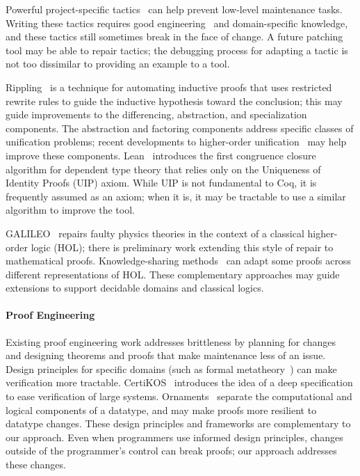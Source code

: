 Powerful project-specific tactics~\cite{chlipala:cpdt, Chlipala2013} can help prevent low-level maintenance tasks.
Writing these tactics requires good engineering~\cite{Gonthier2011} and domain-specific knowledge,
and these tactics still sometimes break in the face of change.
A future patching tool may be able to repair tactics; the debugging process
for adapting a tactic is not too dissimilar to providing an example to a tool.

Rippling~\cite{rippling} is a technique for automating inductive proofs that uses restricted rewrite rules to
guide the inductive hypothesis toward the conclusion; this may guide improvements to the
differencing, abstraction, and specialization components.
The abstraction and factoring components address specific classes of unification problems;
recent developments to higher-order unification~\cite{Miller:2012:PHL:2331097} may help
improve these components.
Lean~\cite{selsam:lean} introduces the first congruence closure algorithm for dependent type theory that
relies only on the Uniqueness of Identity Proofs (UIP) axiom. While UIP is not fundamental to Coq,
it is frequently assumed as an axiom; when it is, it may be tractable to use a similar algorithm to improve the tool.

GALILEO~\cite{bundyreasoning} repairs faulty physics theories
in the context of a classical higher-order logic (HOL); there is preliminary work extending this
style of repair to mathematical proofs. 
Knowledge-sharing methods~\cite{tgck-cicm14} can adapt some proofs across different representations of HOL.
These complementary approaches may guide extensions to support decidable domains and classical logics.

\paragraph{Proof Engineering} Existing proof engineering work addresses brittleness
by planning for changes~\cite{proof-eng} and designing theorems and proofs that make maintenance less of an issue.
Design principles for specific domains (such as formal metatheory~\cite{Aydemir2008, Delaware2013POPL, Delaware2013ICFP})
can make verification more tractable. CertiKOS~\cite{certikos} introduces the idea of a deep specification to
ease verification of large systems.
Ornaments~\cite{Dagand17jfp, Williams:2014:OP:2633628.2633631}
separate the computational and logical components of a datatype, and may
make proofs more resilient to datatype changes.
These design principles and frameworks are complementary to our approach.
Even when programmers use informed design principles,
changes outside of the programmer's control can break proofs;
our approach addresses these changes.

